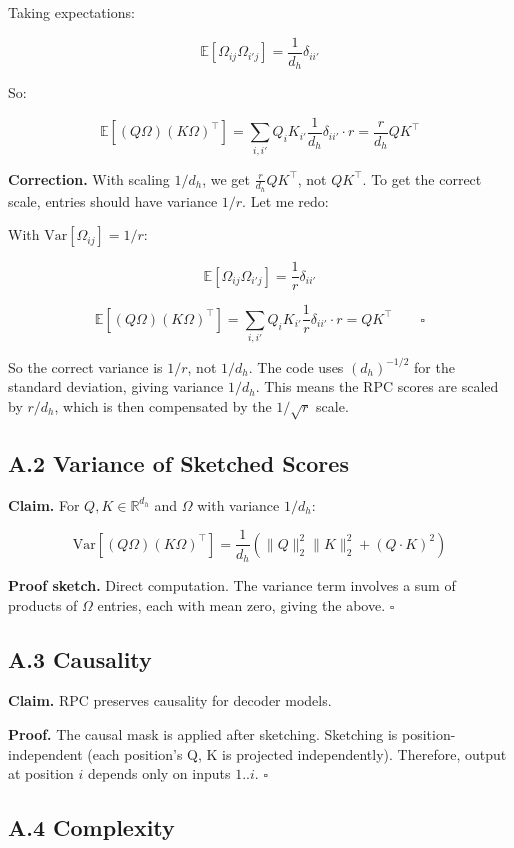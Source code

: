 Taking expectations:

\[
\mathbb{E}[\Omega_{ij} \Omega_{i'j}] = \frac{1}{d_h} \delta_{ii'}
\]

So:

\[
\mathbb{E}[(Q\Omega)(K\Omega)^\top] = \sum_{i, i'} Q_i K_{i'} \frac{1}{d_h} \delta_{ii'} \cdot r = \frac{r}{d_h} Q K^\top
\]

\textbf{Correction.} With scaling $1/d_h$, we get $\frac{r}{d_h} Q K^\top$, not $Q K^\top$. To get the correct scale, entries should have variance $1/r$. Let me redo:

With $\text{Var}[\Omega_{ij}] = 1/r$:

\[
\mathbb{E}[\Omega_{ij} \Omega_{i'j}] = \frac{1}{r} \delta_{ii'}
\]

\[
\mathbb{E}[(Q\Omega)(K\Omega)^\top] = \sum_{i, i'} Q_i K_{i'} \frac{1}{r} \delta_{ii'} \cdot r = Q K^\top \qquad \square
\]

So the correct variance is $1/r$, not $1/d_h$. The code uses $(d_h)^{-1/2}$ for the standard deviation, giving variance $1/d_h$. This means the RPC scores are scaled by $r/d_h$, which is then compensated by the $1/\sqrt{r}$ scale.

\subsection{A.2 Variance of Sketched Scores}

\textbf{Claim.} For $Q, K \in \mathbb{R}^{d_h}$ and $\Omega$ with variance $1/d_h$:

\[
\text{Var}[(Q\Omega)(K\Omega)^\top] = \frac{1}{d_h} \left(\|Q\|_2^2 \|K\|_2^2 + (Q \cdot K)^2\right)
\tag{A.2}
\]

\textbf{Proof sketch.} Direct computation. The variance term involves a sum of products of $\Omega$ entries, each with mean zero, giving the above. $\square$

\subsection{A.3 Causality}

\textbf{Claim.} RPC preserves causality for decoder models.

\textbf{Proof.} The causal mask is applied after sketching. Sketching is 
position-independent (each position's Q, K is projected independently). 
Therefore, output at position $i$ depends only on inputs $1..i$. $\square$

\subsection{A.4 Complexity}

